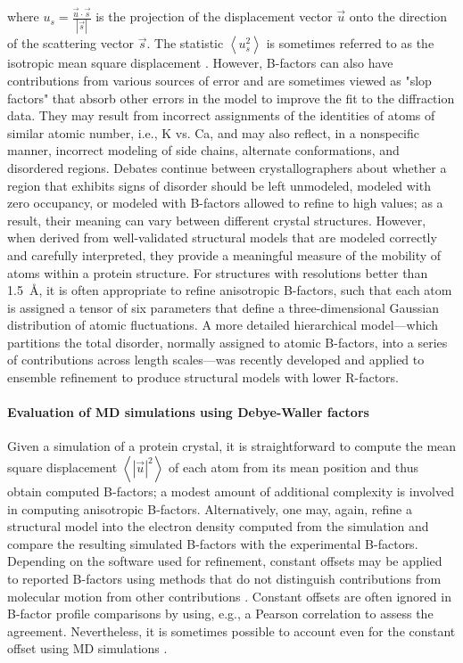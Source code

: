 \documentclass[9pt,review,pubversion]{livecoms}
\begin{document}
\noindent where $u_s = \frac {\vec{u} \cdot \vec{s}} {\left| \vec{s} \right|}$ is the projection of the displacement vector $\vec{u}$ onto the direction of the scattering vector $\vec{s}$.
The statistic $\left\langle u_s^2 \right\rangle$ is sometimes referred to as the isotropic mean square displacement \cite{trueblood_atomic_1996}.
However, B-factors can also have contributions from various sources of error and are sometimes viewed as "slop factors" that absorb other errors in the model to improve the fit to the diffraction data.
They may result from incorrect assignments of the identities of atoms of similar atomic number, i.e., K vs. Ca, and may also reflect, in a nonspecific manner, incorrect modeling of side chains, alternate conformations, and disordered regions.
Debates continue between crystallographers about whether a region that exhibits signs of disorder should be left unmodeled, modeled with zero occupancy, or modeled with B-factors allowed to refine to high values; as a result, their meaning can vary between different crystal structures.
However, when derived from well-validated structural models \cite{williams_molprobity_2018} that are modeled correctly and carefully interpreted, they provide a meaningful measure of the mobility of atoms within a protein structure.
For structures with resolutions better than \qty{1.5}{\angstrom}, it is often appropriate to refine anisotropic B-factors, such that each atom is assigned a tensor of six parameters that define a three-dimensional Gaussian distribution of atomic fluctuations.
A more detailed hierarchical model---which partitions the total disorder, normally assigned to atomic B-factors, into a series of contributions across length scales---was recently developed \cite{pearce_method_2021} and applied to ensemble refinement \cite{ploscariu_improving_2021} to produce structural models with lower R-factors.

\paragraph{Evaluation of MD simulations using Debye-Waller factors}

Given a simulation of a protein crystal, it is straightforward to compute the mean square displacement $\left\langle \left| \vec{u} \right|^2 \right\rangle$ of each atom from its mean position and thus obtain computed B-factors; a modest amount of additional complexity is involved in computing anisotropic B-factors.
Alternatively, one may, again, refine a structural model into the electron density computed from the simulation and compare the resulting simulated B-factors with the experimental B-factors.
Depending on the software used for refinement, constant offsets may be applied to reported B-factors using methods that do not distinguish contributions from molecular motion from other contributions \cite{liebschner_macromolecular_2019}.
Constant offsets are often ignored in B-factor profile comparisons by using, e.g., a Pearson correlation to assess the agreement. Nevertheless, it is sometimes possible to account even for the constant offset using MD simulations \cite{wall_internal_2018}.
\end{document}
